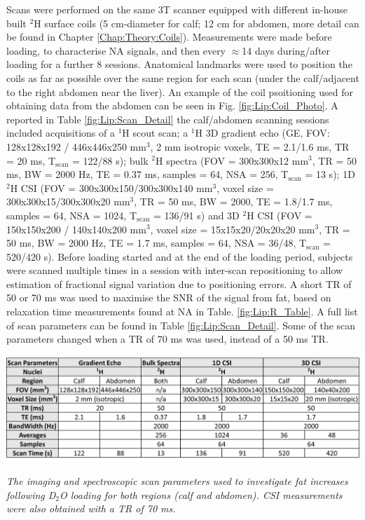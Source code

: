 Scans were performed on the same 3T scanner equipped with different in-house built $^2$H surface coils (5 cm-diameter for calf; 12 cm for abdomen, more detail can be found in Chapter \ref{Chap:Theory:Coils}). Measurements were made before loading, to characterise \ac{NA} signals, and then every $\approx$14 days during/after loading for a further 8 sessions. Anatomical landmarks were used to position the coils as far as possible over the same region for each scan (under the calf/adjacent to the right abdomen near the liver). An example of the coil psoitioning used for obtaining data from the abdomen can be seen in Fig. \ref{fig:Lip:Coil_Photo}. A reported in Table \ref{fig:Lip:Scan_Detail} the calf/abdomen scanning sessions included acquisitions of a $^1$H scout scan; a $^1$H 3D gradient echo (\ac{GE}, \ac{FOV}: 128x128x192 / 446x446x250 mm$^3$, 2 mm isotropic voxels, \ac{TE} = 2.1/1.6 ms, TR = 20 ms, T$_\text{scan}$ = 122/88 s); bulk $^2$H spectra (\ac{FOV} = 300x300x12 mm$^3$, \ac{TR} = 50 ms, \ac{BW} = 2000 Hz, \ac{TE} = 0.37 ms, samples = 64, NSA = 256, T$_\text{scan}$ = 13 s); 1D $^2$H \ac{CSI} (\ac{FOV} = 300x300x150/300x300x140 mm$^3$, voxel size = 300x300x15/300x300x20 mm$^3$, \ac{TR} = 50 ms, \ac{BW} = 2000, \ac{TE} = 1.8/1.7 ms, samples = 64, NSA = 1024, T$_\text{scan}$ = 136/91 s) and 3D $^2$H \ac{CSI} (\ac{FOV} = 150x150x200 / 140x140x200 mm$^3$, voxel size = 15x15x20/20x20x20 mm$^3$, TR = 50 ms, \ac{BW} = 2000 Hz, \ac{TE} = 1.7 ms, samples = 64, NSA = 36/48, T$_\text{scan}$ = 520/420 s). Before loading started and at the end of the loading period, subjects were scanned multiple times in a session with inter-scan repositioning to allow estimation of fractional signal variation due to positioning errors. A short \ac{TR} of 50 or 70 ms was used to maximise the \ac{SNR} of the signal from fat, based on relaxation time measurements found at \ac{NA} in Table. \ref{fig:Lip:R_Table}. A full list of scan parameters can be found in Table \ref{fig:Lip:Scan_Detail}. Some of the scan parameters changed when a \ac{TR} of 70 ms was used, instead of a 50 ms \ac{TR}. 

\begin{table}
    \centering
    \includegraphics[width=1\textwidth]{Figures/Lipid/Scan_Details.png}
    \caption{\textit{The imaging and spectroscopic scan parameters used to investigate fat increases following D$_2$O loading for both regions (calf and abdomen). CSI measurements were also obtained with a \ac{TR} of 70 ms.}}
    \label{fig:Lip:Scan_Detail}
\end{table}

